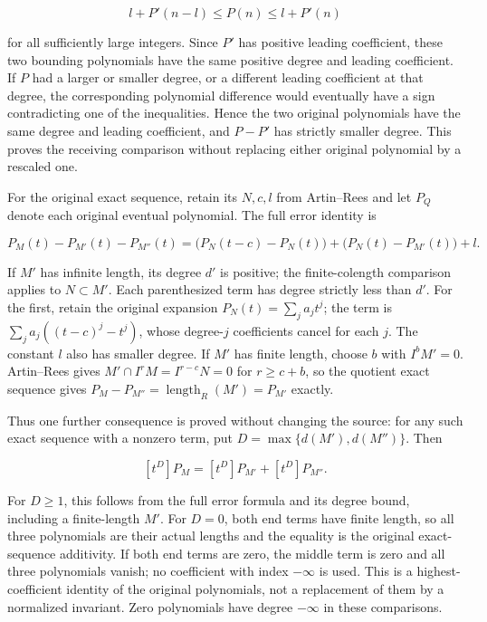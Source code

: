 \[
l+P'(n-l)\leq P(n)\leq l+P'(n)
\]

for all sufficiently large integers. Since \(P'\) has positive leading coefficient, these two bounding polynomials have the same positive degree and leading coefficient. If \(P\) had a larger or smaller degree, or a different leading coefficient at that degree, the corresponding polynomial difference would eventually have a sign contradicting one of the inequalities. Hence the two original polynomials have the same degree and leading coefficient, and \(P-P'\) has strictly smaller degree. This proves the receiving comparison without replacing either original polynomial by a rescaled one.

For the original exact sequence, retain its \(N,c,l\) from Artin--Rees and let \(P_Q\) denote each original eventual polynomial. The full error identity is

\[
P_M(t)-P_{M'}(t)-P_{M''}(t)
=\bigl(P_N(t-c)-P_N(t)\bigr)
 +\bigl(P_N(t)-P_{M'}(t)\bigr)+l.
\]

If \(M'\) has infinite length, its degree \(d'\) is positive; the finite-colength comparison applies to \(N\subset M'\). Each parenthesized term has degree strictly less than \(d'\). For the first, retain the original expansion \(P_N(t)=\sum_j a_jt^j\); the term is \(\sum_j a_j((t-c)^j-t^j)\), whose degree-\(j\) coefficients cancel for each \(j\). The constant \(l\) also has smaller degree. If \(M'\) has finite length, choose \(b\) with \(I^bM'=0\). Artin--Rees gives \(M'\cap I^rM=I^{r-c}N=0\) for \(r\geq c+b\), so the quotient exact sequence gives \(P_M-P_{M''}=\operatorname{length}_R(M')=P_{M'}\) exactly.

Thus one further consequence is proved without changing the source: for any such exact sequence with a nonzero term, put \(D=\max\{d(M'),d(M'')\}\). Then

\[
[t^D]P_M=[t^D]P_{M'}+[t^D]P_{M''}.
\]

For \(D\geq1\), this follows from the full error formula and its degree bound, including a finite-length \(M'\). For \(D=0\), both end terms have finite length, so all three polynomials are their actual lengths and the equality is the original exact-sequence additivity. If both end terms are zero, the middle term is zero and all three polynomials vanish; no coefficient with index \(-\infty\) is used. This is a highest-coefficient identity of the original polynomials, not a replacement of them by a normalized invariant. Zero polynomials have degree \(-\infty\) in these comparisons.

